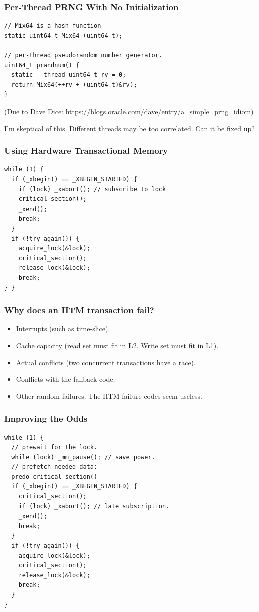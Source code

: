 \documentclass[xcolor=dvipsnames,14pt]{beamer}
\begin{document}
\begin{frame}[fragile]
\frametitle{Per-Thread PRNG With No Initialization}

\begin{verbatim}
// Mix64 is a hash function
static uint64_t Mix64 (uint64_t);

// per-thread pseudorandom number generator.
uint64_t prandnum() {
  static __thread uint64_t rv = 0;
  return Mix64(++rv + (uint64_t)&rv);
}
\end{verbatim}

(Due to Dave Dice:
\url{https://blogs.oracle.com/dave/entry/a_simple_prng_idiom})

I'm skeptical of this.  Different threads may be too correlated.  Can
it be fixed up?

\end{frame}

\begin{frame}[fragile]
\frametitle{Using Hardware Transactional Memory}

\begin{verbatim}
while (1) {
  if (_xbegin() == _XBEGIN_STARTED) {
    if (lock) _xabort(); // subscribe to lock
    critical_section();
    _xend();
    break;
  }
  if (!try_again()) {
    acquire_lock(&lock);
    critical_section();
    release_lock(&lock);
    break;
} }
\end{verbatim}
\end{frame}

\begin{frame}
\frametitle{Why does an HTM transaction fail?}
\begin{itemize}
\item Interrupts (such as time-slice).
\item Cache capacity (read set must fit in L2.  Write set must fit in L1).
\item Actual conflicts (two concurrent transactions have a race).
\item Conflicts with the fallback code.
\item Other random failures.  The HTM failure codes seem useless.
\end{itemize}

\end{frame}

\begin{frame}[fragile]
\frametitle{Improving the Odds}

\begin{verbatim}
while (1) {
  // prewait for the lock.
  while (lock) _mm_pause(); // save power.
  // prefetch needed data:
  predo_critical_section()
  if (_xbegin() == _XBEGIN_STARTED) {
    critical_section();
    if (lock) _xabort(); // late subscription.
    _xend();
    break;
  }
  if (!try_again()) {
    acquire_lock(&lock);
    critical_section();
    release_lock(&lock);
    break;
  }
}
\end{verbatim}
\end{frame}
\end{document}
